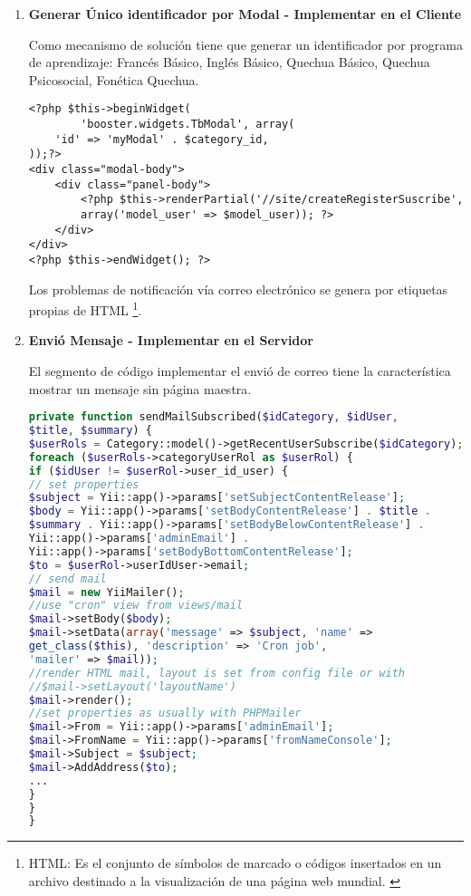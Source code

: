 \begin{enumerate}

\item \textbf{Generar Único identificador por Modal - Implementar en
el Cliente}

Como mecanismo de solución tiene que generar un identificador por programa de
aprendizaje: Francés Básico, Inglés Básico, Quechua Básico,
Quechua Psicosocial, Fonética Quechua.

\begin{lstlisting}[caption={Generador ventana modal.}]
<?php $this->beginWidget(
        'booster.widgets.TbModal', array(
    'id' => 'myModal' . $category_id,
));?>
<div class="modal-body">
    <div class="panel-body">
        <?php $this->renderPartial('//site/createRegisterSuscribe', 
        array('model_user' => $model_user)); ?>
    </div>
</div>
<?php $this->endWidget(); ?>
\end{lstlisting}

Los problemas de notificación vía correo electrónico se genera por etiquetas
propias de HTML \footnote{HTML: Es el conjunto de símbolos de marcado o
códigos insertados en un archivo destinado a la visualización de una página
web mundial. \cite{html}}.

\item \textbf{Envió Mensaje - Implementar en el Servidor}

El segmento de código implementar el envió de correo tiene la característica
mostrar un mensaje sin página maestra.

\begin{lstlisting}[language = PHP, caption={Envió de mensaje sin  contenedor de página.}]
private function sendMailSubscribed($idCategory, $idUser,
$title, $summary) {
$userRols = Category::model()->getRecentUserSubscribe($idCategory);
foreach ($userRols->categoryUserRol as $userRol) {
if ($idUser != $userRol->user_id_user) {
// set properties
$subject = Yii::app()->params['setSubjectContentRelease'];
$body = Yii::app()->params['setBodyContentRelease'] . $title .
$summary . Yii::app()->params['setBodyBelowContentRelease'] . 
Yii::app()->params['adminEmail'] . 
Yii::app()->params['setBodyBottomContentRelease'];
$to = $userRol->userIdUser->email;
// send mail
$mail = new YiiMailer();
//use "cron" view from views/mail
$mail->setBody($body);
$mail->setData(array('message' => $subject, 'name' => 
get_class($this), 'description' => 'Cron job', 
'mailer' => $mail));
//render HTML mail, layout is set from config file or with 
//$mail->setLayout('layoutName')
$mail->render();
//set properties as usually with PHPMailer
$mail->From = Yii::app()->params['adminEmail'];
$mail->FromName = Yii::app()->params['fromNameConsole'];
$mail->Subject = $subject;
$mail->AddAddress($to);
...
}
}
}
\end{lstlisting}

\end{enumerate}


